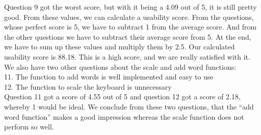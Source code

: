 Question 9 got the worst score, but with it being a 4.09 out of 5, it is still pretty good. From these values, we can calculate a usability score. From the questions, whose perfect score is 5, we have to subtract 1 from the average score. And from the other questions we have to subtract their average score from 5. At the end, we have to sum up these values and multiply them by 2.5. Our calculated usability score is 88.18. This is a high score, and we are really satisfied with it.\\
We also have two other questions about the scale and add word functions:\\
11. The function to add words is well implemented and easy to use\\
12. The function to scale the keyboard is unnecessary\\
Question 11 got a score of 4.55 out of 5 and question 12 got a score of 2.18, whereby 1 would be ideal. We conclude from these two questions, that the ``add word function'' makes a good impression whereas the scale function does not perform so well.\\

